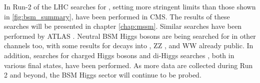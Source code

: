 In Run-2 of the \acs{LHC} searches for \AHtotautau, setting more stringent limits than those shown in \ref{fig:bsm_summary},
have been performed in \acs{CMS}. The results of these searches will be presented in chapter \ref{chap:mssm}. 
Similar searches have been performed by ATLAS \cite{ATLASMSSMtautau2016}. Neutral BSM Higgs bosons
are being searched for in other channels too, with some results for decays into \ttbar \cite{ATLASHttbar}, 
ZZ \cite{CMSHZZ2016,ATLASHZZ2016}, and WW \cite{ATLASHeavyHWW} already public.
In addition, searches for charged
Higgs bosons \cite{ATLASHplustaunu,ATLASHplustb,CMSHplustaunu} and
di-Higgs searches \cite{ATLASHbbgamgam,ATLASHgamgamWW,ATLASHhhbbbb,CMSbbgamgam,CMSHbbtautau,CMSHbbWW}, both in 
various final states, have been performed. As more data are collected during Run 2 and beyond, the \ac{BSM}
Higgs sector will continue to be probed.

